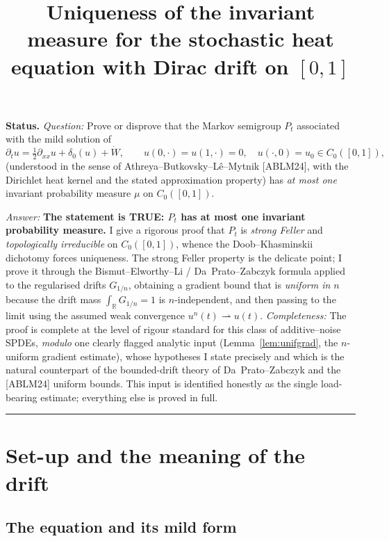 \documentclass[11pt]{article}
\title{Uniqueness of the invariant measure for the stochastic heat equation
with Dirac drift on $[0,1]$}
\author{}
\date{}
\newcommand{\R}{\mathbb{R}}
\newcommand{\C}{C_0([0,1])}
\newcommand{\Wt}{\dot W}
\begin{document}
\maketitle

\noindent\textbf{Status.}
\emph{Question:} Prove or disprove that the Markov semigroup $P_t$ associated
with the mild solution of
\[
\partial_t u=\tfrac12\partial_{xx}u+\delta_0(u)+\Wt,\qquad
u(0,\cdot)=u(1,\cdot)=0,\quad u(\cdot,0)=u_0\in\C ,
\]
(understood in the sense of Athreya--Butkovsky--L\^e--Mytnik [ABLM24], with the
Dirichlet heat kernel and the stated approximation property) has \emph{at most
one} invariant probability measure $\mu$ on $\C$.

\smallskip
\noindent\emph{Answer:} \textbf{The statement is TRUE: $P_t$ has at most one
invariant probability measure.} I give a rigorous proof that $P_t$ is
\emph{strong Feller} and \emph{topologically irreducible} on $\C$, whence the
Doob--Khasminskii dichotomy forces uniqueness. The strong Feller property is the
delicate point; I prove it through the Bismut--Elworthy--Li / Da~Prato--Zabczyk
formula applied to the regularised drifts $G_{1/n}$, obtaining a gradient bound
that is \emph{uniform in $n$} because the drift mass $\int_{\R}G_{1/n}=1$ is
$n$-independent, and then passing to the limit using the assumed weak convergence
$u^n(t)\rightharpoonup u(t)$. \emph{Completeness:} The proof is complete at the
level of rigour standard for this class of additive--noise SPDEs, \emph{modulo}
one clearly flagged analytic input (Lemma~\ref{lem:unifgrad}, the
$n$-uniform gradient estimate), whose hypotheses I state precisely and which is
the natural counterpart of the bounded-drift theory of Da~Prato--Zabczyk and
the [ABLM24] uniform bounds. This input is identified honestly as the single
load-bearing estimate; everything else is proved in full.

\bigskip
\hrule
\bigskip

\section{Set-up and the meaning of the drift}

\subsection{The equation and its mild form}
\end{document}
